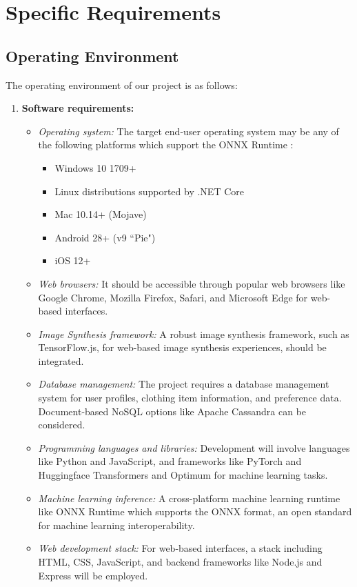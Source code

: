 \section{Specific Requirements}
	\subsection{Operating Environment}
		The operating environment of our project is as follows:

		\begin{enumerate}
			\item \textbf{Software requirements:}
				\begin{itemize}
					\item \textit{Operating system:} The target end-user operating system may be any of the following platforms which support the ONNX Runtime \cite{onnxruntimeCompatibility}:
						\begin{itemize}
							\item Windows 10 1709+
							\item Linux distributions supported by .NET Core
							\item Mac 10.14+ (Mojave)
							\item Android 28+ (v9 ``Pie")
							\item iOS 12+
						\end{itemize}
					\item \textit{Web browsers:} It should be accessible through popular web browsers like Google Chrome, Mozilla Firefox, Safari, and Microsoft Edge for web-based interfaces.
					\item \textit{Image Synthesis framework:} A robust image synthesis framework, such as TensorFlow.js, for web-based image synthesis experiences, should be integrated.
					\item \textit{Database management:} The project requires a database management system for user profiles, clothing item information, and preference data. Document-based NoSQL options like Apache Cassandra can be considered.
					\item \textit{Programming languages and libraries:} Development will involve languages like Python and JavaScript, and frameworks like PyTorch and Huggingface Transformers and Optimum for machine learning tasks.
					\item \textit{Machine learning inference:} A cross-platform machine learning runtime like ONNX Runtime which supports the ONNX format, an open standard for machine learning interoperability.
					\item \textit{Web development stack:} For web-based interfaces, a stack including HTML, CSS, JavaScript, and backend frameworks like Node.js and Express will be employed.

\end{itemize}
\end{enumerate}
